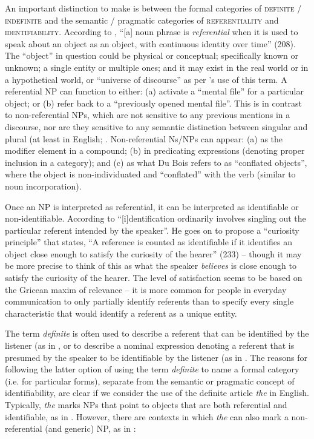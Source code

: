 \documentclass[output=paper]{langsci/langscibook}
\begin{document}
An important distinction to make is between the formal categories of \textsc{definite / indefinite} and the semantic / pragmatic categories of \textsc{referentiality} and \textsc{identifiability}. According to \cite{DuBois1980}, “[a] noun phrase is \textit{referential} when it is used to speak about an object as an object, with continuous identity over time” (208). The “object” in question could be physical or conceptual; specifically known or unknown; a single entity or multiple ones; and it may exist in the real world or in a hypothetical world, or “universe of discourse” as per \citet[388]{Givon2001}'s use of this term. A referential NP can function to either: (a) activate a “mental file” for a particular object; or (b) refer back to a “previously opened mental file”. This is in contrast to non-referential NPs, which are not sensitive to any previous mentions in a discourse, nor are they sensitive to any semantic distinction between singular and plural (at least in English; \citealt[210]{DuBois1980}. Non-referential Ns/NPs can appear: (a) as the modifier element in a compound; (b) in predicating expressions (denoting proper inclusion in a category); and (c) as what Du Bois refers to as “conflated objects”, where the object is non-individuated and “conflated” with the verb (similar to noun incorporation).

Once an NP is interpreted as referential, it can be interpreted as identifiable or non-identifiable. According to \citet[232]{DuBois1980} “[i]dentification ordinarily involves singling out the particular referent intended by the speaker”. He goes on to propose a “curiosity principle” that states, “A reference is counted as identifiable if it identifies an object close enough to satisfy the curiosity of the hearer” (233) – though it may be more precise to think of this as what the speaker \textit{believes} is close enough to satisfy the curiosity of the hearer. The level of satisfaction seems to be based on the Gricean maxim of relevance – it is more common for people in everyday communication to only partially identify referents than to specify every single characteristic that would identify a referent as a unique entity.

The term \textit{definite} is often used to describe a referent that can be identified by the listener (as in \citealt[65]{Comrie1989}, or to describe a nominal expression denoting a referent that is presumed by the speaker to be identifiable by the listener (as in \citealt[79]{Lambrecht1994}. The reasons for following the latter option of using the term \textit{definite} to name a formal category (i.e. for particular forms), separate from the semantic or pragmatic concept of identifiability, are clear if we consider the use of the definite article \textit{the} in English. Typically, \textit{the} marks NPs that point to objects that are both referential and identifiable, as in . However, there are contexts in which \textit{the} can also mark a non-referential (and generic) NP, as in :
\end{document}
